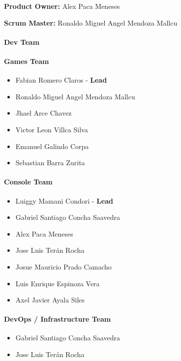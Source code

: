 \textbf{Product Owner: }
Alex Paca Meneses

\textbf{Scrum Master: }
Ronaldo Miguel Angel Mendoza Mallcu

\hypertarget{devteam-4}{
\paragraph{\texorpdfstring{\textbf{Dev
Team}}{Dev Team}}\label{devteam-4}}

\paragraph{Games Team}\label{games-team-4}

\begin{itemize}
\tightlist
\item
  Fabian Romero Claros - \textbf{Lead}
\item
  Ronaldo Miguel Angel Mendoza Mallcu
\item
  Jhael Arce Chavez
\item
  Victor Leon Villca Silva
\item
  Emanuel Galindo Corpa
\item
  Sebastian Barra Zurita
\end{itemize}

\paragraph{Console Team}\label{console-team-4}

\begin{itemize}
\tightlist
\item
  Luiggy Mamani Condori - \textbf{Lead}
\item
  Gabriel Santiago Concha Saavedra
\item
  Alex Paca Meneses
\item
  Jose Luis Terán Rocha
\item
  Josue Mauricio Prado Camacho
\item
  Luis Enrique Espinoza Vera
\item
  Axel Javier Ayala Siles
\end{itemize}

\paragraph{DevOps / Infrastructure Team}\label{devops-team-4}

\begin{itemize}
\tightlist
\item
  Gabriel Santiago Concha Saavedra
\item
  Jose Luis Terán Rocha
\end{itemize}

